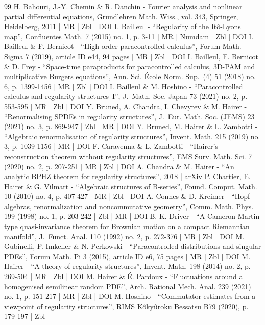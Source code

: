 \documentclass[10pt]{amsart}
\theoremstyle{plain}
\theoremstyle{definition}
\begin{document}
\begin{thebibliography}{99}
H. Bahouri, J.-Y. Chemin \& R. Danchin - Fourier analysis and nonlinear partial differential equations, Grundlehren Math. Wiss., vol. 343, Springer, Heidelberg, 2011 | MR | Zbl | DOI
I. Bailleul - “Regularity of the Itô-Lyons map”, Confluentes Math. 7 (2015) no. 1, p. 3-11 | MR | Numdam | Zbl | DOI
I. Bailleul \& F. Bernicot - “High order paracontrolled calculus”, Forum Math. Sigma 7 (2019), article ID e44, 94 pages | MR | Zbl | DOI
I. Bailleul, F. Bernicot \& D. Frey - “Space-time paraproducts for paracontrolled calculus, 3D-PAM and multiplicative Burgers equations”, Ann. Sci. École Norm. Sup. (4) 51 (2018) no. 6, p. 1399-1456 | MR | Zbl | DOI
I. Bailleul \& M. Hoshino - “Paracontrolled calculus and regularity structures I”, J. Math. Soc. Japan 73 (2021) no. 2, p. 553-595 | MR | Zbl | DOI
Y. Bruned, A. Chandra, I. Chevyrev \& M. Hairer - “Renormalising SPDEs in regularity structures”, J. Eur. Math. Soc. (JEMS) 23 (2021) no. 3, p. 869-947 | Zbl | MR | DOI
Y. Bruned, M. Hairer \& L. Zambotti - “Algebraic renormalisation of regularity structures”, Invent. Math. 215 (2019) no. 3, p. 1039-1156 | MR | DOI
F. Caravenna \& L. Zambotti - “Hairer’s reconstruction theorem without regularity structures”, EMS Surv. Math. Sci. 7 (2020) no. 2, p. 207-251 | MR | Zbl | DOI
A. Chandra \& M. Hairer - “An analytic BPHZ theorem for regularity structures”, 2018 | arXiv
P. Chartier, E. Hairer \& G. Vilmart - “Algebraic structures of B-series”, Found. Comput. Math. 10 (2010) no. 4, p. 407-427 | MR | Zbl | DOI
A. Connes \& D. Kreimer - “Hopf algebras, renormalization and noncommutative geometry”, Comm. Math. Phys. 199 (1998) no. 1, p. 203-242 | Zbl | MR | DOI
B. K. Driver - “A Cameron-Martin type quasi-invariance theorem for Brownian motion on a compact Riemannian manifold”, J. Funct. Anal. 110 (1992) no. 2, p. 272-376 | MR | Zbl | DOI
M. Gubinelli, P. Imkeller \& N. Perkowski - “Paracontrolled distributions and singular PDEs”, Forum Math. Pi 3 (2015), article ID e6, 75 pages | MR | Zbl | DOI
M. Hairer - “A theory of regularity structures”, Invent. Math. 198 (2014) no. 2, p. 269-504 | MR | Zbl | DOI
M. Hairer \& É. Pardoux - “Fluctuations around a homogenised semilinear random PDE”, Arch. Rational Mech. Anal. 239 (2021) no. 1, p. 151-217 | MR | Zbl | DOI
M. Hoshino - “Commutator estimates from a viewpoint of regularity structures”, RIMS Kôkyûroku Bessatsu B79 (2020), p. 179-197 | Zbl

\end{thebibliography}
\end{document}
